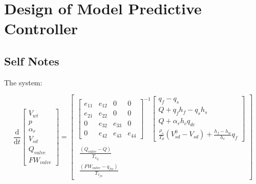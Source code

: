 \chapter{Design of Model Predictive Controller}

\section{Self Notes}
        \clearpage
        
        The system:
        
        \begin{equation*}
            \frac{\mathrm{d} }{\mathrm{d} t} 
            \left [ \begin{matrix}  V_{wt}\\ p\\ \alpha_r\\ V_{sd} \\  Q_{valve} \\ FW_{valve}  \end{matrix} \right ]  
            =
            \left [ \begin{matrix}  \left [ \begin{matrix}e_{11}& e_{12}& 0& 0 \\ e_{21}& e_{22}& 0& 0 \\ 0 & e_{32}& e_{33}& 0 \\ 0 & e_{42}& e_{43}& e_{44}\end{matrix} \right ] ^{-1} \left [ \begin{matrix} q_f  - q_s \\ Q + q_f h_f  - q_s h_s\\ Q + \alpha_r h_c q_{dc} \\ \frac{\rho_s}{T_d}  \left ( V_{sd}^0  - V_{sd}\right ) + \frac{h_f - h_w}{h_c}q_f \end{matrix} 
            \right ] \\   \begin{matrix} \frac{\left(  Q_{valve}  - Q       \right)}{T_{v_{Q }}} \\\frac{\left( FW_{valve}  - q_{fw}  \right)}{T_{v_{fw}}}   \end{matrix}  \end{matrix} \right ]
        \end{equation*}
        
